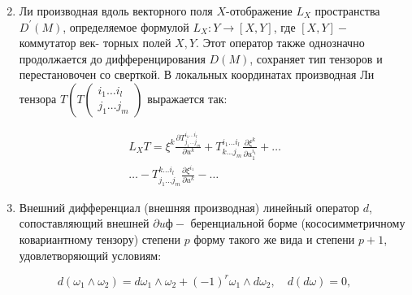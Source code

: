 \documentclass[10pt]{article}
\begin{document}
\begin{enumerate}

  \setcounter{enumi}{1}

  \item Ли производная вдоль векторного поля $X$-отображение $L_{X}$ пространства $D^{\prime}(M)$, определяемое формулой $L_{X}: Y \rightarrow[X, Y]$, где $[X, Y]-$ коммутатор век- торных полей $X, Y$. Этот оператор также однозначно продолжается до дифференцирования $D(M)$, сохраняет тип тензоров и перестановочен со сверткой. В локальных координатах производная Ли тензора $T\left(T\left(\begin{array}{l}i_{1} \ldots i_{l} \\ j_{1} \ldots j_{m}\end{array}\right)\right.$ выражается так:

\end{enumerate}



\[

\begin{gathered}

L_{X} T=\xi^{k} \frac{\partial T_{j_{1} \ldots j_{m}}^{i_{1} \ldots i_{l}}}{\partial u^{k}}+T_{k \ldots j_{m}}^{i_{1} \ldots i_{l}} \frac{\partial \xi^{k}}{\partial u_{1}^{i_{1}}}+\ldots \\

\ldots-T_{j_{1} \ldots j_{m}}^{k \ldots i_{l}} \frac{\partial \xi^{i_{1}}}{\partial u^{k}}-\ldots

\end{gathered}

\]



\begin{enumerate}

  \setcounter{enumi}{2}

  \item Внешний дифференциал (внешняя производная) линейный оператор $d$, сопоставляющий внешней $\partial u ф-$ беренциальной борме (кососимметричному ковариантному тензору) степени $p$ форму такого же вида и степени $p+1$, удовлетворяющий условиям:

\end{enumerate}



\[

d\left(\omega_{1} \wedge \omega_{2}\right)=d \omega_{1} \wedge \omega_{2}+(-1)^{r} \omega_{1} \wedge d \omega_{2}, \quad d(d \omega)=0,

\]
\end{document}
